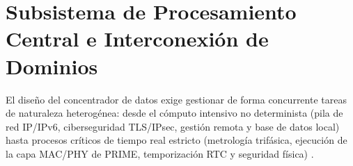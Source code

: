 

\section{Subsistema de Procesamiento Central e Interconexión de Dominios}
\label{sec:procesamiento_central}

El diseño del concentrador de datos exige gestionar de forma concurrente tareas de naturaleza heterogénea: desde el cómputo intensivo no determinista (pila de red IP/IPv6, ciberseguridad TLS/IPsec, gestión remota y base de datos local) hasta procesos críticos de tiempo real estricto (metrología trifásica, ejecución de la capa MAC/PHY de PRIME, temporización RTC y seguridad física) \cite{7147624, 7778783}. 


